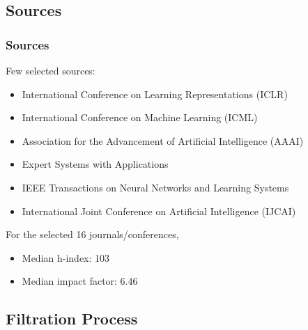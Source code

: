 \documentclass[
	11pt, %
]{beamer}
\begin{document}

\subsection{Sources}

\begin{frame}
	\frametitle{Sources}
    

    Few selected sources:
    
	\begin{itemize}
		\item International Conference on Learning Representations (ICLR)
        \item International Conference on Machine Learning (ICML)
        \item Association for the Advancement of Artificial Intelligence (AAAI)
        \item Expert Systems with Applications
        \item IEEE Transactions on Neural Networks and Learning Systems
        \item International Joint Conference on Artificial Intelligence (IJCAI)
	\end{itemize}

    
	\bigskip %

    For the selected 16 journals/conferences,

    \bigskip %

    \begin{itemize}
        \item Median h-index: 103
        \item Median impact factor: 6.46
    \end{itemize}
    
\end{frame}

\subsection{Filtration Process}
\end{document}
